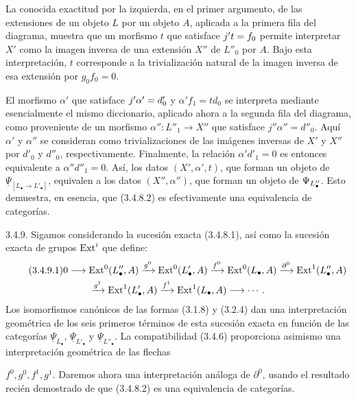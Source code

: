 
La conocida exactitud por la izquierda, en el primer argumento, de las
extensiones de un objeto $L$ por un objeto $A$, aplicada a la primera fila
del diagrama, muestra que un morfismo $t$ que satisface
$\sisi{j}{j'}t=f_0$ permite interpretar $X'$ como la imagen inversa de
una extensión $X''$ de $L''_0$ por $A$. Bajo esta interpretación, $t$
corresponde a la trivialización natural de la imagen inversa de esa
extensión por $g_0f_0=0$.

El morfismo $\alpha'$ que satisface $\sisi{j}{j'}\alpha'=d'_0$ y
$\alpha'f_1=td_0$ se interpreta mediante esencialmente el mismo
diccionario, aplicado ahora a la segunda fila del diagrama, como proveniente
de un morfismo $\alpha'':L''_1\longrightarrow X''$ que satisface
$j''\alpha''=d''_0$. Aquí $\alpha'$ y $\alpha''$ se consideran como
trivializaciones de las imágenes inversas de $X'$ y $X''$ por $d'_0$ y
$d''_0$, respectivamente. Finalmente, la relación $\alpha'd'_1=0$ es
entonces equivalente a $\alpha''d''_1=0$. Así, los datos
$(X',\alpha',t)$, que forman un objeto de
$\underline\Psi_{[L_\bullet\longrightarrow L'_\bullet]}$, equivalen a
los datos $(X'',\alpha'')$, que forman un objeto de
$\sisi{\underline\Psi_{L_\bullet}}{\underline\Psi_{L''_\bullet}}$.
Esto demuestra, en esencia, que (3.4.8.2) es efectivamente una equivalencia
de categorías.

3.4.9. Sigamos considerando la sucesión exacta (3.4.8.1), así como la
sucesión exacta de grupos $\Ext^i$ que define:
\begin{multline}\tag{3.4.9.1}
 0\longrightarrow\Ext^0(L''_\bullet,A)
 \xrightarrow{g^0}\sisi{\Ext^0(L'_\bullet A)}{\Ext^0(L'_\bullet,A)}
 \xrightarrow{f^0}\Ext^0(L_\bullet,A)
 \xrightarrow{\partial^0}\Ext^1(L''_\bullet,A)\\
 \xrightarrow{g^1}\Ext^1(L'_\bullet,A)
 \xrightarrow{f^1}\Ext^1(L_\bullet,A)\longrightarrow\cdots.
\end{multline}
Los isomorfismos canónicos de las formas (3.1.8) y (3.2.4) dan una
interpretación geométrica de los seis primeros términos de esta sucesión
exacta en función de las categorías $\underline\Psi_{L_\bullet}$,
$\underline\Psi_{L'_\bullet}$ y $\underline\Psi_{L''_\bullet}$. La
compatibilidad (3.4.6) proporciona asimismo una interpretación geométrica
de las flechas


$f^0,g^0,f^1,g^1$. Daremos ahora una interpretación análoga de
$\partial^0$, usando el resultado recién demostrado de que (3.4.8.2) es
una equivalencia de categorías.

